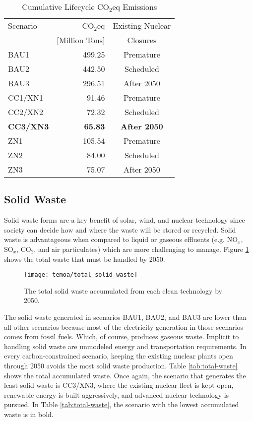 \begin{table}[H]
  \centering
        \caption{Cumulative Lifecycle CO$_2$eq Emissions}
  \label{tab:co2eq-cumulative}
  \begin{tabular}{lrc}
    \hline
    Scenario & CO$_2$eq & Existing Nuclear \\
    & [Million Tons]& Closures \\
    \hline
    BAU1 & 499.25& Premature\\
    BAU2 & 442.50& Scheduled\\
    BAU3 & 296.51& After 2050\\
    CC1/XN1 & 91.46 & Premature\\
    CC2/XN2 & 72.32& Scheduled\\
    \textbf{CC3/XN3} & \textbf{65.83}& \textbf{After 2050}\\
    ZN1 & 105.54& Premature\\
    ZN2 & 84.00& Scheduled\\
    ZN3 & 75.07& After 2050\\
    \hline
  \end{tabular}
\end{table}

\subsection{Solid Waste}

Solid waste forms are a key benefit of solar, wind, and nuclear technology since
society can decide how and where the waste will be stored or recycled. Solid 
waste is advantageous when compared to liquid or gaseous effluents (e.g. 
NO$_x$, SO$_x$, CO$_2$, and air particulates) which are 
more challenging to manage. Figure
\ref{fig:total-waste} shows the total waste that must be handled by 2050.

\begin{figure}[H]
  \centering
  \texttt{[image: temoa/total\_solid\_waste]}
  \caption{The total solid waste accumulated from each clean technology by
  2050.}
  \label{fig:total-waste}
\end{figure}

The solid waste generated in scenarios BAU1, BAU2, and BAU3 are lower than all
other scenarios because most of the electricity generation in those scenarios
comes from fossil fuels. Which, of course, produces gaseous waste. Implicit to
handling solid waste are unmodeled energy and transportation requirements.
In every carbon-constrained scenario, keeping the existing nuclear plants open
through 2050 avoids the most solid waste production. Table \ref{tab:total-waste}
shows the total accumulated waste. Once again, the scenario that generates the
least solid waste is CC3/XN3, where the existing nuclear fleet is kept open,
renewable energy is built aggressively, and advanced nuclear technology is
pursued. In Table \ref{tab:total-waste}, the scenario with the lowest
accumulated waste is in bold.

